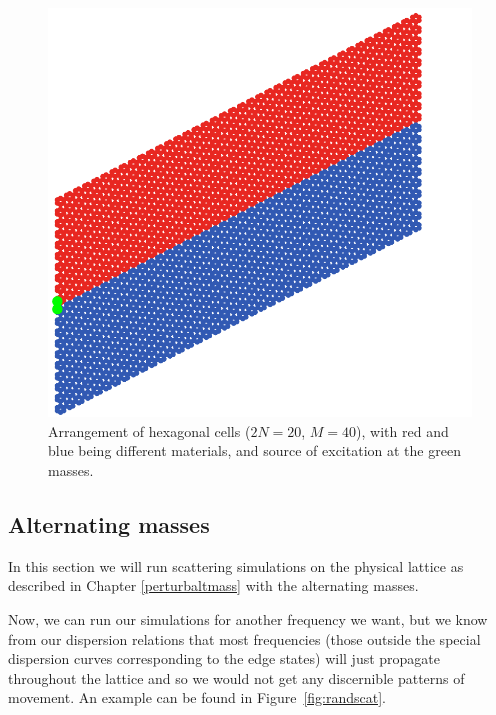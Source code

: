 \begin{figure}
  \centering
  \includegraphics[width=0.6\linewidth]{imgs/hexstdfinlattice.png}
  \caption{Arrangement of hexagonal cells ($2N=20$, $M=40$), with red and blue
    being different materials, and source of excitation at the green masses.}
  \label{fig:hexstdfinlattice}
\end{figure}

\subsection{Alternating masses}

In this section we will run scattering simulations on the physical lattice as
described in Chapter \ref{perturbaltmass} with the alternating masses.

Now, we can run our simulations for another frequency we want, but we know from
our dispersion relations that most frequencies (those outside the special
dispersion curves corresponding to the edge states) will just propagate
throughout the lattice and so we would not get any discernible patterns of
movement. An example can be found in Figure~\ref{fig:randscat}.

